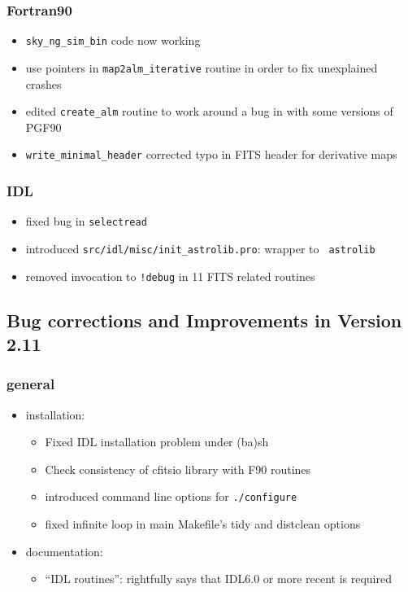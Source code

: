 \documentclass[12pt,twoside]{article}
\begin{document}
{{\subsubsection[Fortran90]{Fortran90}
	\begin{itemize}
	\item {\tt sky\_ng\_sim\_bin} code now working
	\item  use pointers in {\tt map2alm\_iterative} routine in order to fix unexplained crashes
	\item edited {\tt create\_alm} routine to work around a bug in with some versions of PGF90
	\item {\tt write\_minimal\_header} corrected typo in FITS header for derivative maps
	\end{itemize}

\subsubsection[IDL]{IDL}
	\begin{itemize}
	\item fixed bug in {\tt selectread}
	\item introduced {\tt src/idl/misc/init\_astrolib.pro}: wrapper to {\tt
astrolib}
	\item removed invocation to {\tt !debug} in 11 FITS related routines
	\end{itemize}
\subsection{Bug corrections and Improvements in Version 2.11}

\subsubsection[New General Improvements]{general}
\begin{itemize}
\item installation:
	\begin{itemize}
	\item Fixed IDL installation problem under (ba)sh
	\item Check consistency of cfitsio library with F90 routines
	\item introduced command line options for {\tt ./configure}
	\item fixed infinite loop in main Makefile's tidy and distclean options
	\end{itemize}
\item documentation:
	\begin{itemize}
	\item ``IDL routines'': rightfully says that IDL6.0 or more recent is required
	\end{itemize}
\end{itemize}


}}
\end{document}
